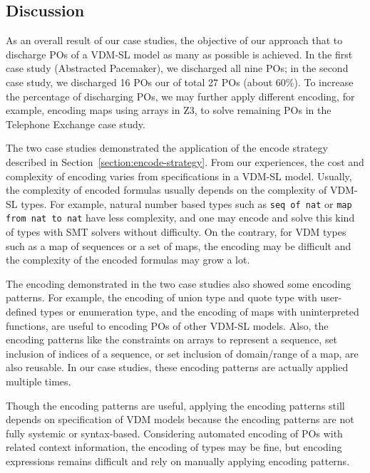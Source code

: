 \subsection{Discussion}

As an overall result of our case studies, the objective of our approach that to discharge POs of a VDM-SL model as many as possible is achieved. In the first case study (Abstracted Pacemaker), we discharged all nine POs; in the second case study, we discharged 16 POs our of total 27 POs (about 60\%). To increase the percentage of discharging POs, we may further apply different encoding, for example, encoding maps using arrays in Z3, to solve remaining POs in the Telephone Exchange case study.

The two case studies demonstrated the application of the encode strategy described in Section~\ref{section:encode-strategy}. From our experiences, the cost and complexity of encoding varies from specifications in a VDM-SL model. Usually, the complexity of encoded formulas usually depends on the complexity of VDM-SL types. For example, natural number based types such as {\tt seq of nat} or {\tt map from nat to nat} have less complexity, and one may encode and solve this kind of types with SMT solvers without difficulty. On the contrary, for VDM types such as a map of sequences or a set of maps, the encoding may be difficult and the complexity of the encoded formulas may grow a lot.

The encoding demonstrated in the two case studies also showed some encoding patterns. For example, the encoding of union type and quote type with user-defined types or enumeration type, and the encoding of maps with uninterpreted functions, are useful to encoding POs of other VDM-SL models. Also, the encoding patterns like the constraints on arrays to represent a sequence, set inclusion of indices of a sequence, or set inclusion of domain/range of a map, are also reusable. In our case studies, these encoding patterns are actually applied multiple times. 

Though the encoding patterns are useful, applying the encoding patterns still depends on specification of VDM models because the encoding patterns are not fully systemic or syntax-based. Considering automated encoding of POs with related context information, the encoding of types may be fine, but encoding expressions remains difficult and rely on manually applying encoding patterns.


